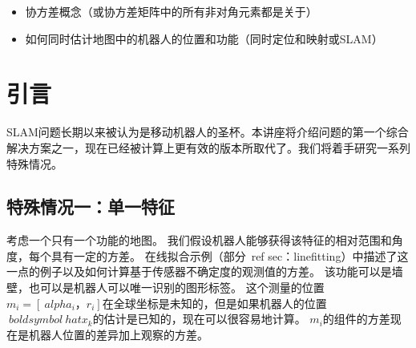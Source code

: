 \begin{itemize}
\item 协方差概念（或协方差矩阵中的所有非对角元素都是关于）
\item 如何同时估计地图中的机器人的位置和功能（同时定位和映射或SLAM）
\end{itemize}



\section{引言}
SLAM问题长期以来被认为是移动机器人的圣杯。本讲座将介绍问题的第一个综合解决方案之一，现在已经被计算上更有效的版本所取代了。我们将着手研究一系列特殊情况。


\subsection{特殊情况一：单一特征}
考虑一个只有一个功能的地图。 我们假设机器人能够获得该特征的相对范围和角度，每个具有一定的方差。 在线拟合示例（部分\ ref {sec：linefitting}）中描述了这一点的例子以及如何计算基于传感器不确定度的观测值的方差。 该功能可以是墙壁，也可以是机器人可以唯一识别的图形标签。 这个测量的位置$ m_i = [\ alpha_i，r_i] $在全球坐标是未知的，但是如果机器人的位置$ \ boldsymbol {\ hat {x} _k} $的估计是已知的，现在可以很容易地计算。 $ m_i $的组件的方差现在是机器人位置的差异加上观察的方差。

